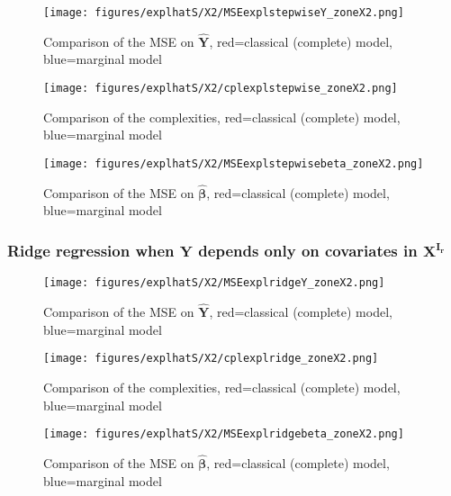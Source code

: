 \documentclass[12pt,a4paper]{report}
\begin{document}
	\begin{figure}[h!]
	\centering
		  \texttt{[image: figures/explhatS/X2/MSEexplstepwiseY\_zoneX2.png]}
		\caption{Comparison of the MSE on $\hat{\boldsymbol{Y}}$, red=classical (complete) model, blue=marginal model}\label{MSEexplstepwiseY_zoneX2}
	\end{figure}
	\begin{figure}[h!]
	\centering
		  \texttt{[image: figures/explhatS/X2/cplexplstepwise\_zoneX2.png]}
		\caption{Comparison of the complexities, red=classical (complete) model, blue=marginal model}\label{cplexplstepwise_zoneX2}
	\end{figure}
	\begin{figure}[h!]
	\centering
		  \texttt{[image: figures/explhatS/X2/MSEexplstepwisebeta\_zoneX2.png]}
		\caption{Comparison of the MSE on $\hat{\boldsymbol{\beta}}$, red=classical (complete) model, blue=marginal model}\label{MSEexplstepwisebeta_zoneX2}
	\end{figure}
	\FloatBarrier
\newpage
\subsubsection{Ridge regression when $\boldsymbol{Y}$ depends only on covariates in $\boldsymbol{X^{I_r}}$}

\begin{figure}[h!]
	\centering
		  \texttt{[image: figures/explhatS/X2/MSEexplridgeY\_zoneX2.png]}
		\caption{Comparison of the MSE on $\hat{\boldsymbol{Y}}$, red=classical (complete) model, blue=marginal model}\label{MSEexplridgeY_zoneX2}
	\end{figure}
	\begin{figure}[h!]
	\centering
		  \texttt{[image: figures/explhatS/X2/cplexplridge\_zoneX2.png]}
		\caption{Comparison of the complexities, red=classical (complete) model, blue=marginal model}\label{cplexplridge_zoneX2}
	\end{figure}
	\begin{figure}[h!]
	\centering
		  \texttt{[image: figures/explhatS/X2/MSEexplridgebeta\_zoneX2.png]}
		\caption{Comparison of the MSE on $\hat{\boldsymbol{\beta}}$, red=classical (complete) model, blue=marginal model}\label{MSEexplridgebeta_zoneX2}
	\end{figure}
	\FloatBarrier
\end{document}

